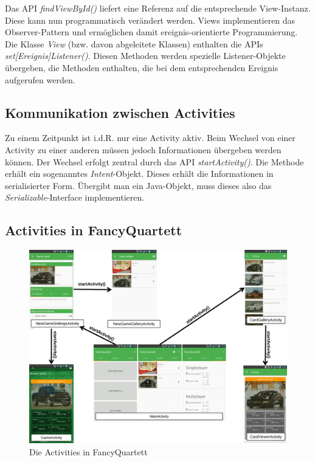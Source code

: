 Das API \emph{findViewById()} liefert eine Referenz auf die entsprechende View-Instanz. Diese kann nun programmatisch verändert werden. Views implementieren das Observer-Pattern und ermöglichen damit ereignis-orientierte Programmierung. Die Klasse \emph{View} (bzw. davon abgeleitete Klassen) enthalten die APIs \emph{set[Ereignis]Listener()}. Diesen Methoden werden spezielle Listener-Objekte übergeben, die Methoden enthalten, die bei dem entsprechenden Ereignis aufgerufen werden.

\subsection{Kommunikation zwischen Activities}

Zu einem Zeitpunkt ist i.d.R. nur eine Activity aktiv. Beim Wechsel von einer Activity zu einer anderen müssen jedoch Informationen übergeben werden können. Der Wechsel erfolgt zentral durch das API \emph{startActivity()}. Die Methode erhält ein sogenanntes \emph{Intent}-Objekt. Dieses erhält die Informationen in serialisierter Form. Übergibt man ein Java-Objekt, muss dieses also das \emph{Serializable}-Interface implementieren.

\subsection{Activities in FancyQuartett}

\begin{figure}[ht]
    \centering
    \includegraphics[width=\textwidth]{../img/Activities.pdf}
    \caption{Die Activities in FancyQuartett}
    \label{fig:activities_in_fancyquartett}
\end{figure}

